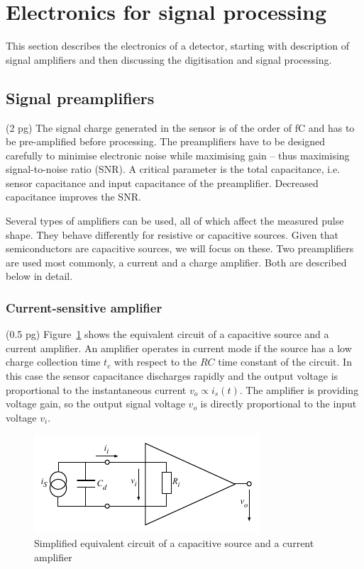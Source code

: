\documentclass[11pt]{mytustyle}  %
\begin{document}
\section{Electronics for signal processing} %
\label{sec:elecsigproc}
This section describes the electronics of a detector, starting with description of signal amplifiers and then discussing the digitisation and signal processing.

\subsection{Signal preamplifiers}
(2 pg)
The signal charge generated in the sensor is of the order of fC and has to be pre-amplified before processing. The preamplifiers have to be designed carefully to minimise electronic noise while maximising gain -- thus maximising signal-to-noise ratio (SNR). A critical parameter is the total capacitance, i.e. sensor capacitance and input capacitance of the preamplifier. Decreased capacitance improves the SNR. 

Several types of amplifiers can be used, all of which affect the measured pulse shape. They behave differently for resistive or capacitive sources. Given that semiconductors are capacitive sources, we will focus on these. Two preamplifiers are used most commonly, a current and a charge amplifier. Both are described below in detail. 


\subsubsection{Current-sensitive amplifier}
(0.5 pg)
Figure~\ref{fig:curramp} shows the equivalent circuit of a capacitive source and a current amplifier. An amplifier operates in current mode if the source has a low charge collection time $t_c$ with respect to the $RC$ time constant of the circuit. In this case the sensor capacitance discharges rapidly and the output voltage is proportional to the instantaneous current $v_o \propto i_s(t)$. The amplifier is providing voltage gain, so the output signal voltage $v_o$ is directly proportional to the input voltage $v_i$.

\begin{figure}[!ht]
\begin{center}
\includegraphics[width=0.6\linewidth]{plots/curramp}
\caption{Simplified equivalent circuit of a capacitive source and a current amplifier}
\label{fig:curramp}
\end{center}
\end{figure}
\end{document}
